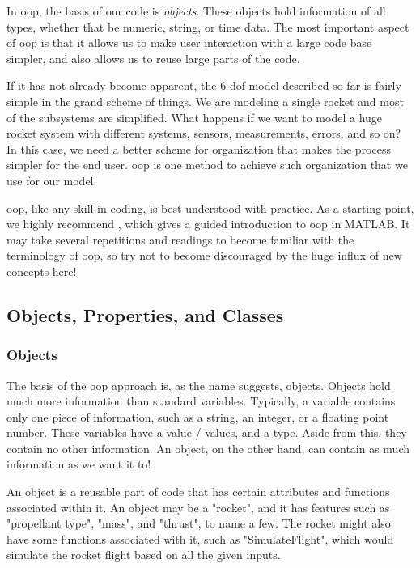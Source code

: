 \documentclass[10pt, openany, titlepage]{book}
\theoremstyle{definition}
\begin{document}
In \gls{oop}, the basis of our code is \textit{objects}. These objects hold information of all types, whether that be numeric, string, or time data. The most important aspect of \gls{oop} is that it allows us to make user interaction with a large code base simpler, and also allows us to reuse large parts of the code.

If it has not already become apparent, the 6-\gls{dof} model described so far is fairly simple in the grand scheme of things. We are modeling a single rocket and most of the subsystems are simplified. What happens if we want to model a huge rocket system with different systems, sensors, measurements, errors, and so on? In this case, we need a better scheme for organization that makes the process simpler for the end user. \Gls{oop} is one method to achieve such organization that we use for our model.

\Gls{oop}, like any skill in coding, is best understood with practice. As a starting point, we highly recommend \cite{tearle_object-oriented_nodate}, which gives a guided introduction to \gls{oop} in MATLAB. It may take several repetitions and readings to become familiar with the terminology of \gls{oop}, so try not to become discouraged by the huge influx of new concepts here!

\subsection{Objects, Properties, and Classes}

\subsubsection{Objects}

The basis of the \gls{oop} approach is, as the name suggests, objects. Objects hold much more information than standard variables. Typically, a variable contains only one piece of information, such as a string, an integer, or a floating point number. These variables have a value / values, and a type. Aside from this, they contain no other information. An object, on the other hand, can contain as much information as we want it to! 

An object is a reusable part of code that has certain attributes and functions associated within it. An object may be a "rocket", and it has features such as "propellant type", "mass", and "thrust", to name a few. The rocket might also have some functions associated with it, such as "SimulateFlight", which would simulate the rocket flight based on all the given inputs.
\end{document}
